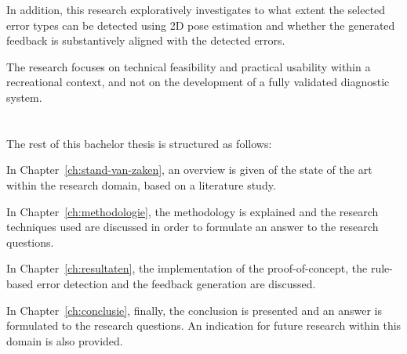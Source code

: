 In addition, this research exploratively investigates to what extent the selected error types can be detected using 2D pose estimation and whether the generated feedback is substantively aligned with the detected errors.

The research focuses on technical feasibility and practical usability within a recreational context, and not on the development of a fully validated diagnostic system.

\section{}%
\label{sec:opzet-bachelorproef}


The rest of this bachelor thesis is structured as follows:

In Chapter~\ref{ch:stand-van-zaken}, an overview is given of the state of the art within the research domain, based on a literature study.

In Chapter~\ref{ch:methodologie}, the methodology is explained and the research techniques used are discussed in order to formulate an answer to the research questions.

In Chapter~\ref{ch:resultaten}, the implementation of the proof-of-concept, the rule-based error detection and the feedback generation are discussed.

In Chapter~\ref{ch:conclusie}, finally, the conclusion is presented and an answer is formulated to the research questions. An indication for future research within this domain is also provided.

